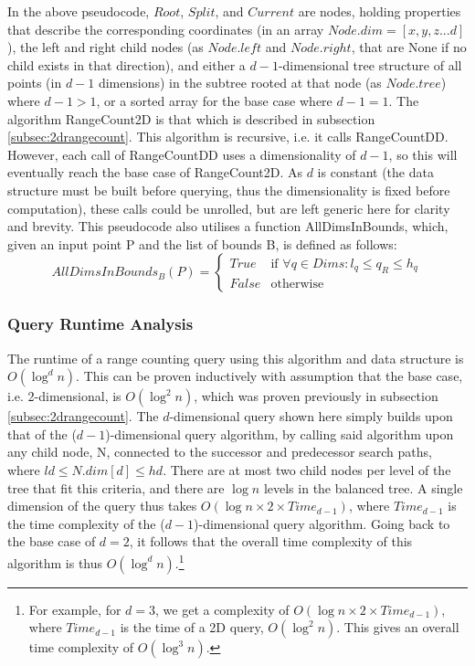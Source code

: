 \documentclass[paper=a4, fontsize=12pt]{article}
\begin{document}
In the above pseudocode, \(Root\), \(Split\), and \(Current\) are nodes, holding
properties that describe the corresponding coordinates (in an array \(Node.dim =
[x, y, z ... d]\)), the left and right child nodes (as \(Node.left\) and
\(Node.right\), that are None if no child exists in that direction), and either
a \(d-1\)-dimensional tree structure of all points (in \(d-1\) dimensions) in
the subtree rooted at that node (as \(Node.tree\)) where \(d-1 > 1\), or a
sorted array for the base case where \(d-1 = 1\). The algorithm RangeCount2D is
that which is described in subsection \ref{subsec:2drangecount}. This algorithm
is recursive, i.e. it calls RangeCountDD. However, each call of RangeCountDD
uses a dimensionality of \(d-1\), so this will eventually reach the base case of
RangeCount2D. As \(d\) is constant (the data structure must be built before
querying, thus the dimensionality is fixed before computation), these calls
could be unrolled, but are left generic here for clarity and brevity. This pseudocode also utilises a function AllDimsInBounds, which, given an input point P and the list of bounds B, is defined as follows:
\begin{displaymath}
AllDimsInBounds_B(P) =
\begin{cases}
True  & \text{if } \forall q \in Dims : l_q \leq q_R \leq h_q \\
False & \text{otherwise}
\end{cases}
\end{displaymath}

\subsubsection{Query Runtime Analysis}

The runtime of a range counting query using this algorithm and data structure is
\(O(\log^d n)\). This can be proven inductively with assumption that the base
case, i.e. 2-dimensional, is \(O(\log^2 n)\), which was proven previously in
subsection \ref{subsec:2drangecount}. The \(d\)-dimensional query shown here
simply builds upon that of the (\(d-1\))-dimensional query algorithm, by calling
said algorithm upon any child node, N, connected to the successor and
predecessor search paths, where \(ld \leq N.dim[d] \leq hd\). There are at most
two child nodes per level of the tree that fit this criteria, and there are
\(\log n\) levels in the balanced tree. A single dimension of the query thus
takes \(O(\log n \times 2 \times Time_{d-1})\), where \(Time_{d-1}\) is the time
complexity of the (\(d-1\))-dimensional query algorithm. Going back to the base
case of \(d=2\), it follows that the overall time complexity of this algorithm
is thus \(O(\log^d n)\).\footnote{For example, for \(d=3\), we get a complexity
  of \(O(\log n \times 2 \times Time_{d-1})\), where \(Time_{d-1}\) is the time
  of a 2D query, \(O(\log^2 n)\). This gives an overall time complexity of
  \(O(\log^3 n)\).}
\end{document}
